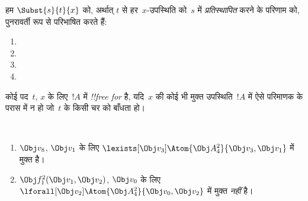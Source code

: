 \documentclass[../../../include/open-logic-section]{subfiles}
\begin{document}


\begin{defn}[किसी पद में प्रतिस्थापन]
हम $\Subst{s}{t}{x}$ को, अर्थात् $t$ से हर~$x$-उपस्थिति को~$s$ में
\emph{प्रतिस्थापित} करने के परिणाम को, पुनरावर्ती रूप से परिभाषित करते हैं:
\begin{enumerate}
\item {}

\item {}

\item {}

\item{}
\end{enumerate}
\end{defn}

\begin{defn}
कोई पद~$t$, $x$ के लिए~$!A$ में \emph{!!{free for}} है, यदि~$x$ की कोई भी
मुक्त उपस्थिति~$!A$ में ऐसे परिमाणक के परास में न हो जो~$t$ के किसी चर को
बाँधता हो।
\end{defn}

\begin{ex} ~
\begin{enumerate}
\item $\Obj v_8$, $\Obj v_1$ के लिए $\lexists[\Obj
  v_3]\Atom{\Obj A^2_4}{\Obj v_3,\Obj v_1}$ में मुक्त है।

\item $\Obj f^2_1(\Obj v_1, \Obj v_2)$, $\Obj
  v_0$ के लिए $\lforall[\Obj v_2]\Atom{\Obj A^2_4}{\Obj v_0,\Obj v_2}$
  में मुक्त \emph{नहीं} है।
\end{enumerate}
\end{ex}
\end{document}

